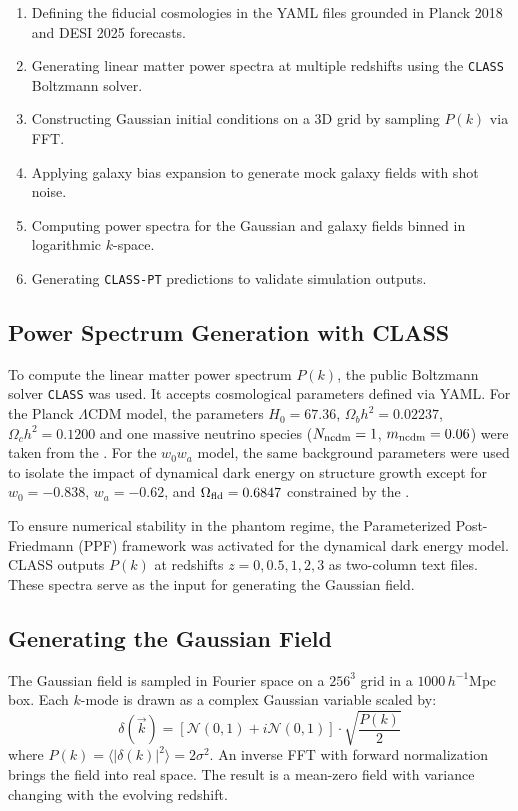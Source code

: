 \documentclass[trackchanges]{aastex7}
\begin{document}
\begin{enumerate}
    \item Defining the fiducial cosmologies in the YAML files grounded in Planck 2018 and DESI 2025 forecasts.
    \item Generating linear matter power spectra at multiple redshifts using the \texttt{CLASS} Boltzmann solver.
    \item Constructing Gaussian initial conditions on a 3D grid by sampling $P(k)$ via FFT.
    \item Applying galaxy bias expansion to generate mock galaxy fields with shot noise.
    \item Computing power spectra for the Gaussian and galaxy fields binned in logarithmic $k$-space.
    \item Generating \texttt{CLASS-PT} predictions to validate simulation outputs.
\end{enumerate}


\subsection{Power Spectrum Generation with CLASS} \label{sec:class_yaml}

To compute the linear matter power spectrum \( P(k) \), the public Boltzmann solver \texttt{CLASS} \citep{CLASS2011} was used. 
It accepts cosmological parameters defined via YAML. 
For the Planck \(\Lambda\)CDM model, the parameters \( H_0 = 67.36 \), \( \Omega_b h^2 = 0.02237 \), \( \Omega_c h^2 = 0.1200 \) and one massive neutrino species (\( N_{\rm ncdm} = 1 \), \( m_{\rm ncdm} = 0.06 \)) were taken from the \citet{Planck2020}. 
For the \( w_0w_a \) model, the same background parameters were used to isolate the impact of dynamical dark energy on structure growth except for
\( w_0 = -0.838 \), \( w_a = -0.62 \), and \( \Omega_{\rm fld} = 0.6847 \) constrained by the \citet{DESI2025}. 

To ensure numerical stability in the phantom regime, the Parameterized Post-Friedmann (PPF) framework was activated for the dynamical dark energy model.
CLASS outputs $P(k)$ at redshifts $z = 0, 0.5, 1, 2, 3$ as two-column text files. 
These spectra serve as the input for generating the Gaussian field.

\subsection{Generating the Gaussian Field}

The Gaussian field is sampled in Fourier space on a \( 256^3 \) grid in a \( 1000 \, h^{-1} \mathrm{Mpc} \) box. Each $k$-mode is drawn as a complex Gaussian variable scaled by:
\begin{equation}
\delta(\vec{k}) = \left[ \mathcal{N}(0,1) + i \mathcal{N}(0,1) \right] \cdot \sqrt{\frac{P(k)}{2}}
\end{equation}
where $P(k) = \langle | \delta(k) |^2 \rangle = 2 \sigma^2$.
An inverse FFT with forward normalization brings the field into real space. 
The result is a mean-zero field with variance changing with the evolving redshift.
\end{document}
